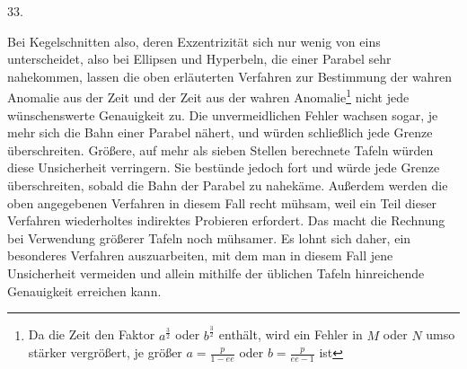 \par{}
\begin{center}
\hypertarget{native-051-article033}{}33.
\end{center}
Bei Kegelschnitten also, deren Exzentrizität sich nur wenig von eins unterscheidet, also bei Ellipsen und Hyperbeln, die einer Parabel sehr nahekommen, lassen die oben erläuterten Verfahren zur Bestimmung der wahren Anomalie aus der Zeit und der Zeit aus der wahren Anomalie\footnote{Da die Zeit den Faktor $a^{\frac{3}{2}}$ oder $b^{\frac{3}{2}}$ enthält, wird ein Fehler in $M$ oder $N$ umso stärker vergrößert, je größer $a=\frac{p}{1-ee}$ oder $b=\frac{p}{ee-1}$ ist} nicht jede wünschenswerte Genauigkeit zu. Die unvermeidlichen Fehler wachsen sogar, je mehr sich die Bahn einer Parabel nähert, und würden schließlich jede Grenze überschreiten. Größere, auf mehr als sieben Stellen berechnete Tafeln würden diese Unsicherheit verringern. Sie bestünde jedoch fort und würde jede Grenze überschreiten, sobald die Bahn der Parabel zu nahekäme. Außerdem werden die oben angegebenen Verfahren in diesem Fall recht mühsam, weil ein Teil dieser Verfahren wiederholtes indirektes Probieren erfordert. Das macht die Rechnung bei Verwendung größerer Tafeln noch mühsamer. Es lohnt sich daher, ein besonderes Verfahren auszuarbeiten, mit dem man in diesem Fall jene Unsicherheit vermeiden und allein mithilfe der üblichen Tafeln hinreichende Genauigkeit erreichen kann.


